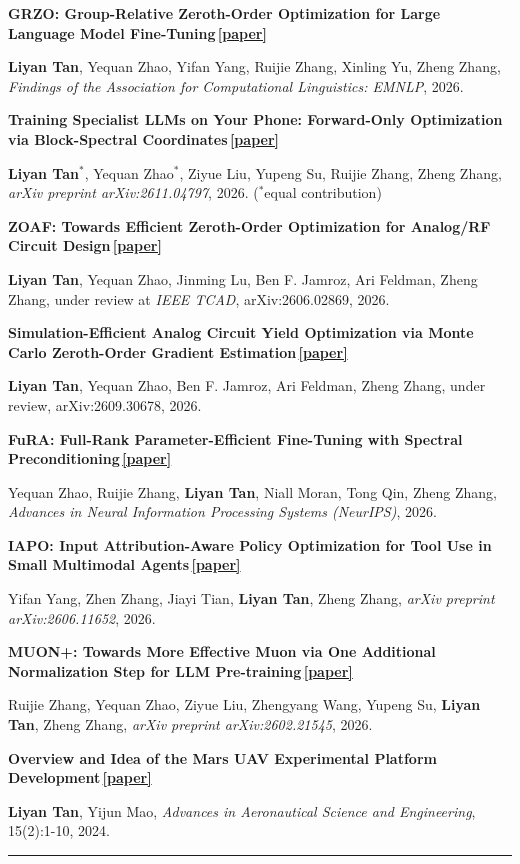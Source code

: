\documentclass[10pt,letterpaper]{article}
\newcommand{\cvsection}[1]{%
  \vspace{0.95em}%
  \noindent{\large\bfseries\color{accent}\textls[110]{\textsc{#1}}}\par
  \vspace{0.12em}%
  {\color{accent}\hrule height 0.7pt}%
  \vspace{0.55em}%
}
\newcommand{\pub}[2]{%
  \vspace{0.55em}
  \noindent\textbf{#1}\par
  \noindent#2\par
}
\newcommand{\me}{\textbf{Liyan Tan}}
\newcommand{\paperlink}[1]{\,{\small\color{accent}\href{#1}{[paper]}}}
\begin{document}
\pub{GRZO: Group-Relative Zeroth-Order Optimization for Large Language Model Fine-Tuning\paperlink{https://arxiv.org/abs/2606.02857}}
{\me, Yequan Zhao, Yifan Yang, Ruijie Zhang, Xinling Yu, Zheng Zhang, \textit{Findings of the Association for Computational Linguistics: EMNLP}, 2026.}

\pub{Training Specialist LLMs on Your Phone: Forward-Only Optimization via Block-Spectral Coordinates\paperlink{https://arxiv.org/abs/2611.04797}}
{\me$^{*}$, Yequan Zhao$^{*}$, Ziyue Liu, Yupeng Su, Ruijie Zhang, Zheng Zhang, \textit{arXiv preprint arXiv:2611.04797}, 2026. {\small\color{muted}($^{*}$equal contribution)}}

\pub{ZOAF: Towards Efficient Zeroth-Order Optimization for Analog/RF Circuit Design\paperlink{https://arxiv.org/abs/2606.02869}}
{\me, Yequan Zhao, Jinming Lu, Ben F. Jamroz, Ari Feldman, Zheng Zhang, under review at \textit{IEEE TCAD}, arXiv:2606.02869, 2026.}

\pub{Simulation-Efficient Analog Circuit Yield Optimization via Monte Carlo Zeroth-Order Gradient Estimation\paperlink{https://arxiv.org/abs/2609.30678}}
{\me, Yequan Zhao, Ben F. Jamroz, Ari Feldman, Zheng Zhang, under review, arXiv:2609.30678, 2026.}

\pub{FuRA: Full-Rank Parameter-Efficient Fine-Tuning with Spectral Preconditioning\paperlink{https://arxiv.org/abs/2605.22869}}
{Yequan Zhao, Ruijie Zhang, \me, Niall Moran, Tong Qin, Zheng Zhang, \textit{Advances in Neural Information Processing Systems (NeurIPS)}, 2026.}

\pub{IAPO: Input Attribution-Aware Policy Optimization for Tool Use in Small Multimodal Agents\paperlink{https://arxiv.org/abs/2606.11652}}
{Yifan Yang, Zhen Zhang, Jiayi Tian, \me, Zheng Zhang, \textit{arXiv preprint arXiv:2606.11652}, 2026.}

\pub{MUON+: Towards More Effective Muon via One Additional Normalization Step for LLM Pre-training\paperlink{https://arxiv.org/abs/2602.21545}}
{Ruijie Zhang, Yequan Zhao, Ziyue Liu, Zhengyang Wang, Yupeng Su, \me, Zheng Zhang, \textit{arXiv preprint arXiv:2602.21545}, 2026.}

\pub{Overview and Idea of the Mars UAV Experimental Platform Development\paperlink{https://scholar.google.com/citations?view_op=view_citation&hl=en&user=xBvnXWsAAAAJ&citation_for_view=xBvnXWsAAAAJ:UeHWp8X0CEIC}}
{\me, Yijun Mao, \textit{Advances in Aeronautical Science and Engineering}, 15(2):1-10, 2024.}

\cvsection{Research Projects}
\end{document}
